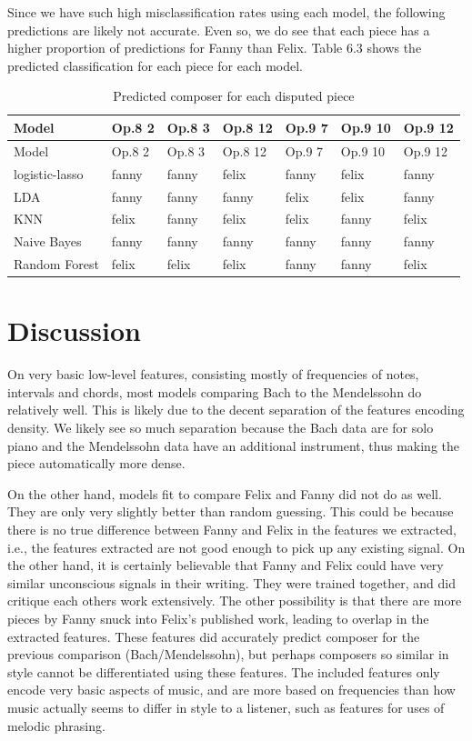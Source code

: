 \documentclass[12pt,twoside]{reedthesis}
\theoremstyle{definition}
\theoremstyle{definition}
\theoremstyle{definition}
\theoremstyle{remark}
\begin{document}
Since we have such high misclassification rates using each model, the
following predictions are likely not accurate. Even so, we do see that
each piece has a higher proportion of predictions for Fanny than Felix.
Table 6.3 shows the predicted classification for each piece for each
model.
\begin{longtable}[]{@{}lllllll@{}}
\caption{Predicted composer for each disputed piece}\tabularnewline
\toprule
Model & Op.8 2 & Op.8 3 & Op.8 12 & Op.9 7 & Op.9 10 & Op.9
12\tabularnewline
\midrule
\endfirsthead
\toprule
Model & Op.8 2 & Op.8 3 & Op.8 12 & Op.9 7 & Op.9 10 & Op.9
12\tabularnewline
\midrule
\endhead
logistic-lasso & fanny & fanny & felix & fanny & felix &
fanny\tabularnewline
LDA & fanny & fanny & fanny & felix & felix & fanny\tabularnewline
KNN & felix & fanny & felix & felix & fanny & felix\tabularnewline
Naive Bayes & fanny & fanny & fanny & fanny & fanny &
fanny\tabularnewline
Random Forest & felix & felix & felix & fanny & fanny &
felix\tabularnewline
\bottomrule
\end{longtable}
\chapter{Discussion}\label{discussion}

On very basic low-level features, consisting mostly of frequencies of
notes, intervals and chords, most models comparing Bach to the
Mendelssohn do relatively well. This is likely due to the decent
separation of the features encoding density. We likely see so much
separation because the Bach data are for solo piano and the Mendelssohn
data have an additional instrument, thus making the piece automatically
more dense.

On the other hand, models fit to compare Felix and Fanny did not do as
well. They are only very slightly better than random guessing. This
could be because there is no true difference between Fanny and Felix in
the features we extracted, i.e., the features extracted are not good
enough to pick up any existing signal. On the other hand, it is
certainly believable that Fanny and Felix could have very similar
unconscious signals in their writing. They were trained together, and
did critique each others work extensively. The other possibility is that
there are more pieces by Fanny snuck into Felix's published work,
leading to overlap in the extracted features. These features did
accurately predict composer for the previous comparison
(Bach/Mendelssohn), but perhaps composers so similar in style cannot be
differentiated using these features. The included features only encode
very basic aspects of music, and are more based on frequencies than how
music actually seems to differ in style to a listener, such as features
for uses of melodic phrasing.
\end{document}
